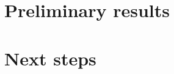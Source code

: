 \documentclass[10pt,twocolumn,letterpaper]{article}
\begin{document}

\section{Preliminary results}


\section{Next steps}


{\small


}
\end{document}
